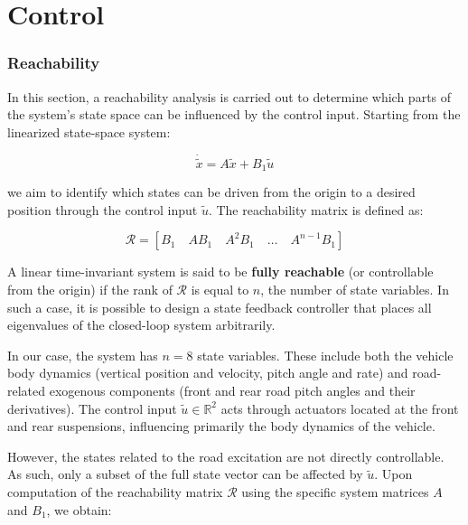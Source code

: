 \documentclass[]{report}
\begin{document}
	\newpage
	\section{Control}
	
	\subsubsection{Reachability}
	\label{reach_ch}
	
	
	
	In this section, a reachability analysis is carried out to determine which parts of the system's state space can be influenced by the control input. Starting from the linearized state-space system:
	
	
\begin{equation}
		\dot{\tilde{x}} = A \tilde{x} + B_1 \tilde{u}
\end{equation}
	
	
	we aim to identify which states can be driven from the origin to a desired position through the control input $\tilde{u}$. The reachability matrix is defined as:
	
	
	\begin{equation}
		\mathcal{R} = \left[ B_1 \quad AB_1 \quad A^2B_1 \quad \dots \quad A^{n-1}B_1 \right]
	\end{equation}

	
	A linear time-invariant system is said to be \textbf{fully reachable} (or controllable from the origin) if the rank of $\mathcal{R}$ is equal to $n$, the number of state variables. In such a case, it is possible to design a state feedback controller that places all eigenvalues of the closed-loop system arbitrarily.
	
	
	In our case, the system has $n = 8$ state variables. These include both the vehicle body dynamics (vertical position and velocity, pitch angle and rate) and road-related exogenous components (front and rear road pitch angles and their derivatives). The control input $\tilde{u} \in \mathbb{R}^2$ acts through actuators located at the front and rear suspensions, influencing primarily the body dynamics of the vehicle.
	
	However, the states related to the road excitation are not directly controllable. As such, only a subset of the full state vector can be affected by $\tilde{u}$. Upon computation of the reachability matrix $\mathcal{R}$ using the specific system matrices $A$ and $B_1$, we obtain:
	
	
\end{document}
